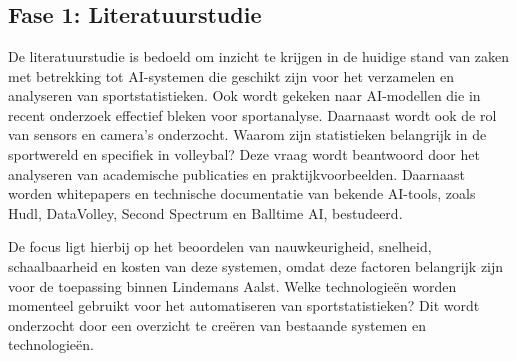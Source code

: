 
\chapter{}%
\label{ch:methodologie}



\section{Fase 1: Literatuurstudie}
De literatuurstudie is bedoeld om inzicht te krijgen in de huidige stand van zaken met betrekking tot AI-systemen die geschikt zijn voor het verzamelen en analyseren van sportstatistieken. Ook wordt gekeken naar AI-modellen die in recent onderzoek effectief bleken voor sportanalyse. Daarnaast wordt ook de rol van sensors en camera's onderzocht. Waarom zijn statistieken belangrijk in de sportwereld en specifiek in volleybal? Deze vraag wordt beantwoord door het analyseren van academische publicaties en praktijkvoorbeelden. Daarnaast worden whitepapers en technische documentatie van bekende AI-tools, zoals Hudl, DataVolley, Second Spectrum en Balltime AI, bestudeerd.

De focus ligt hierbij op het beoordelen van nauwkeurigheid, snelheid, schaalbaarheid en kosten van deze systemen, omdat deze factoren belangrijk zijn voor de toepassing binnen Lindemans Aalst. Welke technologieën worden momenteel gebruikt voor het automatiseren van sportstatistieken? Dit wordt onderzocht door een overzicht te creëren van bestaande systemen en technologieën.


